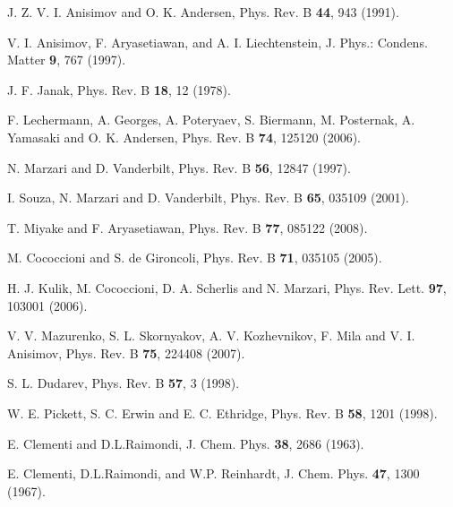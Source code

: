 \documentclass[a4paper,oneside,11pt]{article}
\numberwithin{equation}{section}
\begin{document}
\begin{thebibliography}{13}

J. Z. V. I. Anisimov and O. K. Andersen, 
	Phys. Rev. B \textbf{44}, 943 (1991).

V. I. Anisimov, F. Aryasetiawan, and A. I. Liechtenstein, 
	J. Phys.: Condens. Matter \textbf{9}, 767 (1997).

J. F. Janak,
Phys. Rev. B \textbf{18}, 12 (1978).

F. Lechermann, A. Georges, A. Poteryaev, S. Biermann, M. Posternak, A. Yamasaki and O. K. Andersen,
Phys. Rev. B \textbf{74}, 125120 (2006).

N. Marzari and D. Vanderbilt,
Phys. Rev. B \textbf{56}, 12847 (1997).

I. Souza, N. Marzari and D. Vanderbilt,
Phys. Rev. B \textbf{65}, 035109 (2001).

T. Miyake and F. Aryasetiawan,
Phys. Rev. B \textbf{77}, 085122 (2008).

M. Cococcioni and S. de Gironcoli,
Phys. Rev. B \textbf{71}, 035105 (2005).

H. J. Kulik, M. Cococcioni, D. A. Scherlis and N. Marzari,
Phys. Rev. Lett. \textbf{97}, 103001 (2006).

V. V. Mazurenko, S. L. Skornyakov, A. V. Kozhevnikov, F. Mila and V. I. Anisimov,
Phys. Rev. B \textbf{75}, 224408 (2007).

S. L. Dudarev,
Phys. Rev. B \textbf{57}, 3 (1998).

W. E. Pickett, S. C. Erwin and E. C. Ethridge,
Phys. Rev. B \textbf{58}, 1201 (1998).

E. Clementi and D.L.Raimondi,
 J. Chem. Phys. \textbf{38}, 2686 (1963). 

E. Clementi, D.L.Raimondi, and W.P. Reinhardt,
 J. Chem. Phys. \textbf{47}, 1300 (1967).

\end{thebibliography}



\end{document}
